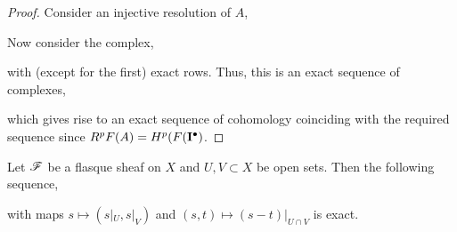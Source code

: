 \documentclass[12pt]{article}
\begin{document}
\begin{proof}
Consider an injective resolution of $A$,
\begin{center}
\end{center}
Now consider the complex,
\begin{center}
\end{center}
with (except for the first) exact rows. Thus, this is an exact sequence of complexes,
\begin{center}
\end{center}
which gives rise to an exact sequence of cohomology coinciding with the required sequence since $R^p F(A) = H^p(F(\bf{I}^\bullet)$. 
\end{proof}

\begin{lemma} \label{lem:flasque_mayer_vietoris}
Let $\F$ be a flasque sheaf on $X$ and $U, V \subset X$ be open sets. Then the following sequence,
\begin{center}
\end{center}
with maps $s \mapsto (s|_U, s|_V)$ and $(s, t) \mapsto (s - t)|_{U \cap V}$ is exact.
\end{lemma}
\end{document}
